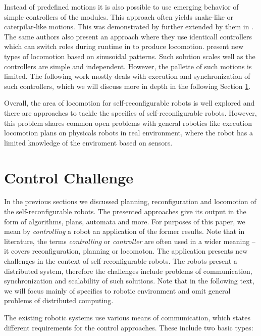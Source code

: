 Instead of predefined motions it is also possible to use emerging behavior of
simple controllers of the modules. This approach often yields snake-like or
caterpilar-like motions. This was demonstrated by \textcite{stoy2002global}
further extended by them in \cite{DBLP:conf/icra/StoySW03}. The same authors
also present an approach where they use identicall controllers which can switch
roles during runtime in \cite{1159219} to produce locomotion.
\textcite{gonzalez2006locomotion} present new types of locomotion based on
sinusoidal patterns. Such solution scales well as the controllers are simple
and independent. However, the pallette of such motions is limited. The following
work mostly deals with execution and synchronization of such controllers, which
we will discuss more in depth in the following Section \ref{sec:chal-control}.


Overall, the area of locomotion for self-reconfigurable robots is well explored
and there are approaches to tackle the specifics of self-reconfigurable robots.
However, this problem shares common open problems with general robotics like
execution locomotion plans on physicals robots in real environment, where the
robot has a limited knowledge of the enviroment based on sensors.

\section{Control Challenge}\label{sec:chal-control}

In the previous sections we discussed planning, reconfiguration and locomotion
of the self-reconfigurable robots. The presented approaches give its output in
the form of algorithms, plans, automata and more. For purposes of this paper, we
mean by \emph{controlling} a robot an application of the former results. Note
that in literature, the terms \emph{controlling} or \emph{controller} are often
used in a wider meaning -- it covers reconfiguration, planning or locomoton. The
application presents new challenges in the context of self-reconfigurable
robots. The robots present a distributed system, therefore the challenges
include problems of communication, synchronization and scalability of such
solutions. Note that in the following text, we will focus mainly of specifics to
robotic environment and omit general problems of distributed computing.

The existing robotic systems use various means of communication, which states
different requirements for the control approaches. These include two basic
types:

